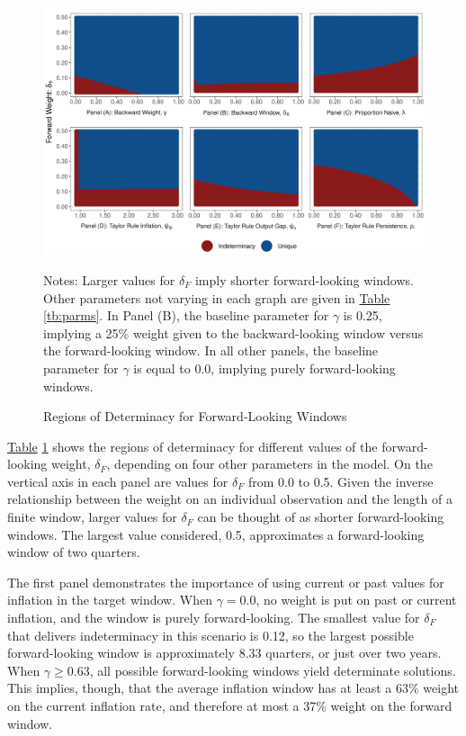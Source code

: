 \documentclass[english,authoryear,12pt]{elsarticle}
\begin{document}
\begin{figure}
	\captionsetup{justification=centering}
	\begin{center}
		\includegraphics[width=\textwidth]{./determinacy_notitle.png}
		\vspace*{3pc}\hspace*{2pc}\parbox{0.9\textwidth}{\small{
			Notes: Larger values for $\delta_F$ imply shorter forward-looking windows. Other parameters not varying in each graph are given in \href{tb:parms}{Table} \ref{tb:parms}. In Panel (B), the baseline parameter for $\gamma$ is 0.25, implying a 25\% weight given to the backward-looking window versus the forward-looking window. In all other panels, the baseline parameter for $\gamma$ is equal to 0.0, implying purely forward-looking windows.}
		}
	\end{center}
	\vspace*{-4pc}\caption{Regions of Determinacy for Forward-Looking Windows}\label{fg:determinacy}
\end{figure}

\href{fg:determinacy}{Table} \ref{fg:determinacy} shows the regions of determinacy for different values of the forward-looking weight, $\delta_F$, depending on four other parameters in the model. On the vertical axis in each panel are values for $\delta_F$ from 0.0 to 0.5. Given the inverse relationship between the weight on an individual observation and the length of a finite window, larger values for $\delta_F$ can be thought of as shorter forward-looking windows. The largest value considered, 0.5, approximates a forward-looking window of two quarters.

The first panel demonstrates the importance of using current or past values for inflation in the target window. When $\gamma=0.0$, no weight is put on past or current inflation, and the window is purely forward-looking. The smallest value for $\delta_F$ that delivers indeterminacy in this scenario is 0.12, so the largest possible forward-looking window is approximately 8.33 quarters, or just over two years. When $\gamma \geq 0.63$, all possible forward-looking windows yield determinate solutions. This implies, though, that the average inflation window has at least a 63\% weight on the current inflation rate, and therefore at most a 37\% weight on the forward window.
\end{document}
